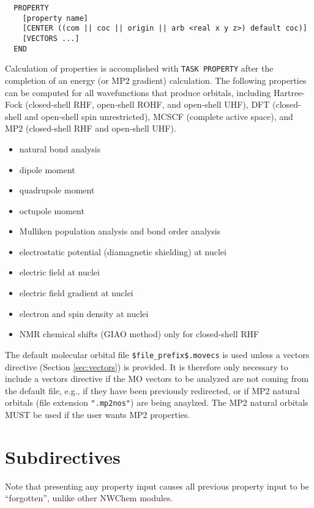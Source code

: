 \label{sec:property}
\begin{verbatim}
  PROPERTY
    [property name]
    [CENTER ((com || coc || origin || arb <real x y z>) default coc)]
    [VECTORS ...]
  END
\end{verbatim}

Calculation of properties is accomplished with \verb+TASK PROPERTY+
after the completion of an energy (or MP2 gradient) calculation.  The
following properties can be computed for all wavefunctions that produce
orbitals, including Hartree-Fock (closed-shell RHF, open-shell ROHF, and
open-shell UHF), DFT (closed-shell and open-shell spin unrestricted),
MCSCF (complete active space), and MP2 (closed-shell RHF and open-shell
UHF).

\begin{itemize}
\item natural bond analysis
\item dipole moment
\item quadrupole moment
\item octupole moment
\item Mulliken population analysis and bond order analysis
\item electrostatic potential (diamagnetic shielding) at nuclei 
\item electric field at nuclei 
\item electric field gradient at nuclei 
\item electron and spin density at nuclei 
\item NMR chemical shifts (GIAO method) only for closed-shell RHF
\end{itemize}

The default molecular orbital file \verb+$file_prefix$.movecs+ is used
unless a vectors directive (Section \ref{sec:vectors}) is provided.  It is
therefore only necessary to include a vectors directive if the MO vectors
to be analyzed are not coming from the default file, e.g., if they have
been previously redirected, or if MP2 natural orbitals (file extension
\verb+".mp2nos"+) are being anaylzed.  The MP2 natural orbitals MUST be
used if the user wants MP2 properties.

\section{Subdirectives}

Note that presenting any property input causes all previous property input
to be ``forgotten'', unlike other NWChem modules.

